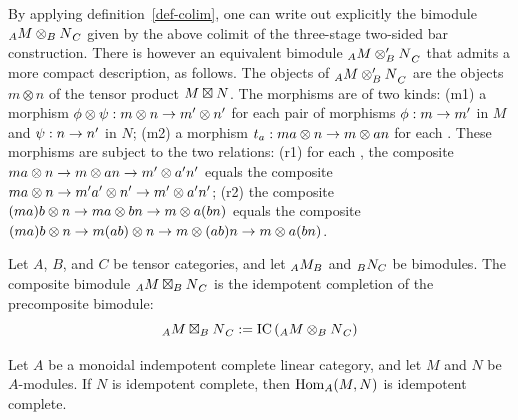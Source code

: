 \documentclass{amsart}
\begin{document}
\begin{remark} 
By applying definition~\ref{def-colim}, one can write out explicitly the bimodule ${}_{A} {M \otimes_B N}_{C}$ given by the above colimit of the three-stage two-sided bar construction.  There is however an equivalent bimodule ${}_{A} {M \otimes_B' N}_{C}$ that admits a more compact description, as follows.  The objects of ${}_{A} {M \otimes_B' N}_{C}$ are the objects $m \otimes n$ of the tensor product $M \boxtimes N$.  The morphisms are of two kinds: (m1) a morphism $\phi \otimes \psi : m \otimes n \rightarrow m' \otimes n'$ for each pair of morphisms $\phi: m \rightarrow m'$ in $M$ and $\psi: n \rightarrow n'$ in $N$; (m2) a morphism $t_a : ma \otimes n \rightarrow m \otimes an$ for each .  These morphisms are subject to the two relations: (r1) for each , the composite $ma \otimes n \rightarrow m \otimes an \rightarrow m' \otimes a' n'$ equals the composite $ma \otimes n \rightarrow m' a' \otimes n' \rightarrow m' \otimes a' n'$; (r2) the composite $(ma)b \otimes n \rightarrow ma \otimes bn \rightarrow m \otimes a(bn)$ equals the composite $(ma)b \otimes n \rightarrow m(ab) \otimes n \rightarrow m \otimes (ab)n \rightarrow m \otimes a(bn)$.
\end{remark} %



\begin{definition}
Let $A$, $B$, and $C$ be tensor categories, and let ${}_{A} {M}_{B}$ and ${}_{B} {N}_{C}$ be bimodules.  The composite bimodule ${}_{A} {M \boxtimes_B N}_{C}$ is the idempotent completion of the precomposite bimodule:
\begin{equation} \nonumber
{}_{A} {M \boxtimes_B N}_{C} := \operatorname{IC} \left( {}_{A} {M \otimes_B N}_{C} \right)
\end{equation}
\end{definition}

\begin{example}
\end{example}


\begin{proposition} 
Let $A$ be a  monoidal indempotent complete linear category, and let $M$ and $N$ be $A$-modules.  If $N$ is idempotent complete, then $\operatorname{Hom}_A(M,N)$ is idempotent complete.
\end{proposition}
\end{document}

